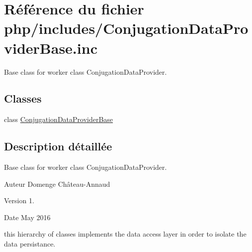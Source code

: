 \hypertarget{ConjugationDataProviderBase_8inc}{}\section{Référence du fichier php/includes/\+Conjugation\+Data\+Provider\+Base.inc}
\label{ConjugationDataProviderBase_8inc}


Base class for worker class Conjugation\+Data\+Provider.  


\subsection*{Classes}
\begin{DoxyCompactItemize}
\item 
class \hyperlink{classConjugationDataProviderBase}{Conjugation\+Data\+Provider\+Base}
\end{DoxyCompactItemize}


\subsection{Description détaillée}
Base class for worker class Conjugation\+Data\+Provider. 

\begin{DoxyAuthor}{Auteur}
Domenge Château-\/\+Annaud 
\end{DoxyAuthor}
\begin{DoxyVersion}{Version}
1. 
\end{DoxyVersion}
\begin{DoxyDate}{Date}
May 2016
\end{DoxyDate}
this hierarchy of classes implements the data access layer in order to isolate the data persistance. 